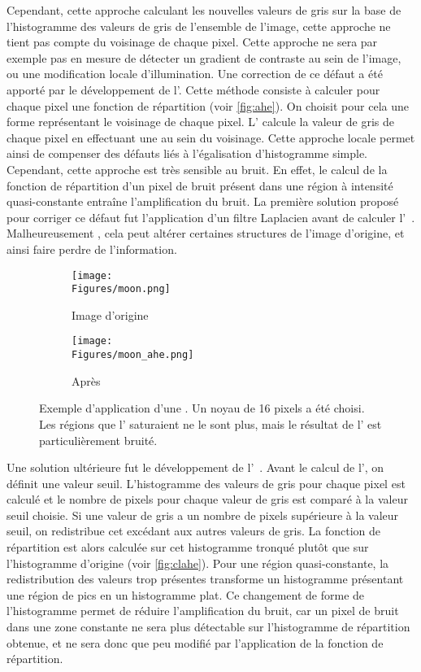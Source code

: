 \documentclass[\main/main.tex]{subfiles}
\begin{document}
%
Cependant, cette approche calculant les nouvelles valeurs de gris sur la base de l'histogramme des valeurs de gris de l'ensemble de l'image, cette approche ne tient pas compte du voisinage de chaque pixel. Cette approche ne sera par exemple pas en mesure de détecter un gradient de contraste au sein de l'image, ou une modification locale d'illumination.
%
Une correction de ce défaut a été apporté par le développement de l'\ahe{}\cite{hummel_1977}. Cette méthode consiste à calculer pour chaque pixel une fonction de répartition (voir \autoref{fig:ahe}).
%
On choisit pour cela une forme représentant le voisinage de chaque pixel. L'\ahe{} calcule  la valeur de gris de chaque pixel en effectuant une \he{} au sein du voisinage. Cette approche locale permet ainsi de compenser des défauts liés à l'égalisation d'histogramme simple.
Cependant, cette approche est très sensible au bruit. En effet, le calcul de la fonction de répartition d'un pixel de bruit présent dans une région à intensité quasi-constante entraîne l'amplification du bruit.
%
La première solution proposé pour corriger ce défaut fut l'application d'un filtre Laplacien avant de calculer l'\ahe{}~\cite{hummel_1977}. Malheureusement , cela peut altérer certaines structures de l'image d'origine, et ainsi faire perdre de l'information.

\begin{figure}[h!]
    \centering
    \begin{subfigure}[b]{0.45\textwidth}
       \caption{
       Image d'origine
            }
       \centering \texttt{[image: \\Figures/moon.png]}
    \end{subfigure}
    \begin{subfigure}[b]{0.45\textwidth}
       \caption{
       Après \ahe{}
            }
       \centering \texttt{[image: \\Figures/moon\_ahe.png]}
    \end{subfigure}
    \caption{
        \label{fig:ahe}
        Exemple d'application d'une \ahe{}.\newline
        Un noyau de 16 pixels a été choisi. Les régions que l'\he{} saturaient ne le sont plus, mais le résultat de l'\ahe{} est particulièrement bruité.
    }
\end{figure}
%
Une solution ultérieure fut le développement de l'\clahe{}~\cite{pizer_1987}. Avant le calcul de l'\clahe{}, on définit une valeur seuil. L'histogramme des valeurs de gris pour chaque pixel est calculé et le nombre de pixels pour chaque valeur de gris est comparé à la valeur seuil choisie. Si une valeur de gris a un nombre de pixels supérieure à la valeur seuil, on redistribue cet excédant aux autres valeurs de gris. La fonction de répartition est alors calculée sur cet histogramme tronqué plutôt que sur l'histogramme d'origine (voir \autoref{fig:clahe}).
%
Pour une région quasi-constante, la redistribution des valeurs trop présentes transforme un histogramme présentant une région de pics en un histogramme plat. Ce changement de forme de l'histogramme permet de réduire l'amplification du bruit, car un pixel de bruit dans une zone constante ne sera plus détectable sur l'histogramme de répartition obtenue, et ne sera donc que peu modifié par l'application de la fonction de répartition.
\end{document}
